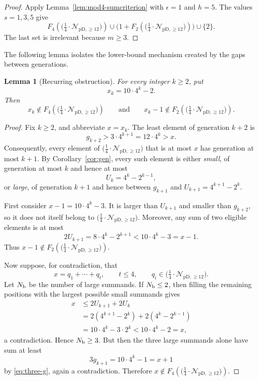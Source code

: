 \documentclass[12pt]{article}
\theoremstyle{plain}
\newtheorem{lemma}[theorem]{Lemma}
\theoremstyle{definition}
\theoremstyle{plain}
\newcommand{\Pset}{%
  \bigl(\tfrac{1}{4}\cdot\mathcal{N}_{\mathrm{pD},\geq 12}\bigr)%
}
\begin{document}
\begin{proof}
Apply Lemma~\ref{lem:mod4-sumcriterion} with $\epsilon=1$ and $h=5$.
The values $s=1,3,5$ give
\[
 F_4(\Pset)\cup\bigl(1+F_2(\Pset)\bigr)\cup\{2\}.
\]
The last set is irrelevant because $m\geq3$.
\end{proof}

The following lemma isolates the lower-bound mechanism created by the
gaps between generations.

\begin{lemma}[Recurring obstruction]\label{lem:obstruction}
For every integer $k\geq2$, put
\[
 x_k=10\cdot4^k-2.
\]
Then
\begin{equation}\label{eq:obstruction}
 x_k\notin F_4(\Pset)
 \qquad\text{and}\qquad
 x_k-1\notin F_2(\Pset).
\end{equation}
\end{lemma}

\begin{proof}
Fix $k\geq2$, and abbreviate $x=x_k$.  The least element of generation
$k+2$ is
\[
 g_{k+2}>3\cdot4^{k+1}=12\cdot4^k>x.
\]
Consequently, every element of $\Pset$ that is at most $x$ has generation
at most $k+1$.  By Corollary~\ref{cor:gen}, every such element is either
\emph{small}, of generation at most $k$ and hence at most
\[
 U_k=4^k-2^{k-1},
\]
or \emph{large}, of generation $k+1$ and hence between $g_{k+1}$ and
$U_{k+1}=4^{k+1}-2^k$.

First consider $x-1=10\cdot4^k-3$.  It is larger than $U_{k+1}$ and
smaller than $g_{k+2}$, so it does not itself belong to $\Pset$.
Moreover, any sum of two eligible elements is at most
\[
 2U_{k+1}=8\cdot4^k-2^{k+1}<10\cdot4^k-3=x-1.
\]
Thus $x-1\notin F_2(\Pset)$.

Now suppose, for contradiction, that
\[
 x=q_1+\cdots+q_t,
 \qquad t\leq4,
 \qquad q_i\in\Pset.
\]
Let $N_{\rm b}$ be the number of large summands.  If $N_{\rm b}\leq2$,
then filling the remaining positions with the largest possible small
summands gives
\begin{align*}
 x
 &\leq2U_{k+1}+2U_k\\
 &=2(4^{k+1}-2^k)+2(4^k-2^{k-1})\\
 &=10\cdot4^k-3\cdot2^k
 <10\cdot4^k-2=x,
\end{align*}
a contradiction.  Hence $N_{\rm b}\geq3$.  But then the three large
summands alone have sum at least
\[
 3g_{k+1}=10\cdot4^k-1=x+1
\]
by \eqref{eq:three-g}, again a contradiction.  Therefore
$x\notin F_4(\Pset)$.
\end{proof}
\end{document}
